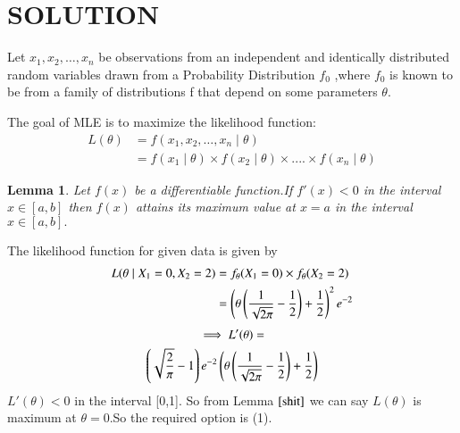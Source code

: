 \documentclass[journal,12pt,twocolumn]{IEEEtran}
\newtheorem{lemma}[theorem]{Lemma}
\begin{document}
\section{SOLUTION}
\begin{definition}
Let $x_1, x_2, \ldots, x_n$
be observations from an independent and identically distributed random variables drawn from a Probability Distribution $f_0$
,where $f_0$ is known to be from a family of distributions f that depend on some parameters $\theta$.
\end{definition}
The goal of MLE is to maximize the likelihood function:
 \begin{align}
L(\theta)&= f(x_1,x_2, \ldots,x_n \; | \;\theta)\\
 &=f(x_1 \;|\; \theta)\times f(x_2 \; |\; \theta)\times....\times f(x_n \;|\;\theta)
\end{align}
\begin{lemma}\label{shit}
Let $f(x)$ be a differentiable function.If $f'(x)<0$ in the interval $x\in[a,b]$ then $f(x)$ attains its maximum value at $x=a$ in the interval $x\in[a,b].$
\end{lemma}
The likelihood function for given data is given by 
\begin{align}
    L(\theta \hspace{0.1cm}|\hspace{0.1cm}X_{1}=0,X_{2}=2)  &=f_{\theta}(X_{1}=0)\times f_{\theta}(X_{2}=2)\\
    &=\left(\theta\left(\dfrac{1}{\sqrt{2\pi}}-\frac{1}{2}\right)+\frac{1}{2}\right)^{2}e^{-2}
\end{align}
\begin{multline}
    \implies L'(\theta)=\\\left(\sqrt{\frac{2}{\pi}}-1\right)e^{-2}\left(\theta\left(\dfrac{1}{\sqrt{2\pi}}-\frac{1}{2}\right)+\frac{1}{2}\right)
\end{multline}
$L'(\theta)<0$ in the interval [0,1]. So from Lemma $\ref{shit}$  we can say $L(\theta)$ is maximum at $\theta=0$.So the required option is (1).
\end{document}
